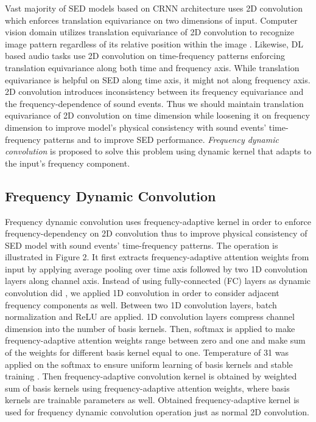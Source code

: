 \documentclass[a4paper]{article}
\begin{document}
Vast majority of SED models based on CRNN architecture \cite{crnn} uses 2D convolution which enforces translation equivariance on two dimensions of input. Computer vision domain utilizes translation equivariance of 2D convolution to recognize image pattern regardless of its relative position within the image \cite{physicsinformedML, vit}. Likewise, DL based audio tasks use 2D convolution on time-frequency patterns enforcing translation equivariance along both time and frequency axis. While translation equivariance is helpful on SED along time axis, it might not along frequency axis. 2D convolution introduces inconsistency between its frequency equivariance and the frequency-dependence of sound events. Thus we should maintain translation equivariance of 2D convolution on time dimension while loosening it on frequency dimension to improve model's physical consistency with sound events' time-frequency patterns and to improve SED performance. \textit{Frequency dynamic convolution} is proposed to solve this problem using dynamic kernel that adapts to the input’s frequency component.


\subsection{Frequency Dynamic Convolution}
\vspace{-5pt}
Frequency dynamic convolution uses frequency-adaptive kernel in order to enforce frequency-dependency on 2D convolution thus to improve physical consistency of SED model with sound events' time-frequency patterns. The operation is illustrated in Figure 2. It first extracts frequency-adaptive attention weights from input by applying average pooling over time axis followed by two 1D convolution layers along channel axis. Instead of using fully-connected (FC) layers as dynamic convolution did \cite{dyconv}, we applied 1D convolution in order to consider adjacent frequency components as well. Between two 1D convolution layers, batch normalization and ReLU are applied. 1D convolution layers compress channel dimension into the number of basis kernels. Then, softmax is applied to make frequency-adaptive attention weights range between zero and one and make sum of the weights for different basis kernel equal to one. Temperature of 31 was applied on the softmax to ensure uniform learning of basis kernels and stable training \cite{tdycnn, dyconv}. Then frequency-adaptive convolution kernel is obtained by weighted sum of basis kernels using frequency-adaptive attention weights, where basis kernels are trainable parameters as well. Obtained frequency-adaptive kernel is used for frequency dynamic convolution operation just as normal 2D convolution.
\end{document}
